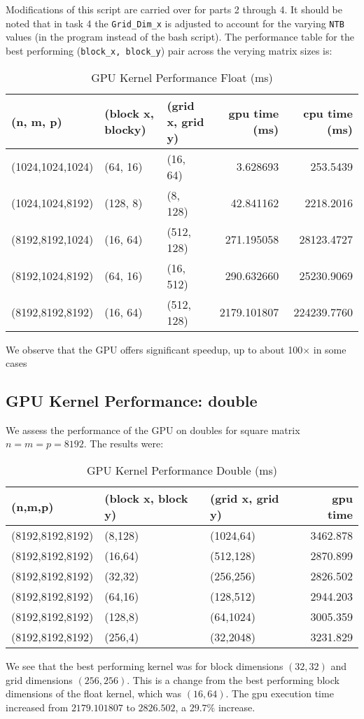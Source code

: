 \documentclass{article}
\begin{document}
\noindent Modifications of this script are carried over for parts 2 through 4. It 
should be noted that in task 4 the \texttt{Grid\_Dim\_x} is adjusted to account for the varying \texttt{NTB} values (in 
the program instead of the bash script).
The performance table for the best performing (\texttt{block\_x, block\_y}) pair 
across the verying matrix sizes is:
\begin{table}[H]
    \centering
    \caption{GPU Kernel Performance Float (ms)}
    \fontsize{12}{14}\selectfont
    \begin{tabular}[t]{lllrr}
    \toprule
    (n, m, p) & (block x, blocky) & (grid x, grid y) & gpu time (ms) & cpu time (ms)\\
    \midrule
    (1024,1024,1024) & (64, 16) & (16, 64) & 3.628693 & 253.5439\\
    (1024,1024,8192) & (128, 8) & (8, 128) & 42.841162 & 2218.2016\\
    (8192,8192,1024) & (16, 64) & (512, 128) & 271.195058 & 28123.4727\\
    (8192,1024,8192) & (64, 16) & (16, 512) & 290.632660 & 25230.9069\\
    (8192,8192,8192) & (16, 64) & (512, 128) & 2179.101807 & 224239.7760\\
    \bottomrule
    \end{tabular}
\end{table}
\noindent We observe that the GPU offers significant speedup, up to about 100$\times$ in some cases

\subsection{GPU Kernel Performance: double}
We assess the performance of the GPU on doubles for square matrix $n=m=p=8192$. 
The results were:
\begin{table}[H]
    \centering
    \caption{GPU Kernel Performance Double (ms)}
    \fontsize{12}{14}\selectfont
    \begin{tabular}[t]{lllr}
    \toprule
    (n,m,p) & (block x, block y) & (grid x, grid y) & gpu time\\
    \midrule
    (8192,8192,8192) & (8,128) & (1024,64) & 3462.878\\
    (8192,8192,8192) & (16,64) & (512,128) & 2870.899\\
    (8192,8192,8192) & (32,32) & (256,256) & 2826.502\\
    (8192,8192,8192) & (64,16) & (128,512) & 2944.203\\
    (8192,8192,8192) & (128,8) & (64,1024) & 3005.359\\
    (8192,8192,8192) & (256,4) & (32,2048) & 3231.829\\
    \bottomrule
    \end{tabular}
\end{table}
\noindent We see that the best performing kernel was for block dimensions $(32,32)$ and grid dimensions $(256,256)$.
This is a change from the best performing block dimensions of the float kernel, which was $(16,64)$. The 
gpu execution time increased from $2179.101807$ to $2826.502$, a $29.7\%$ increase.
\end{document}
